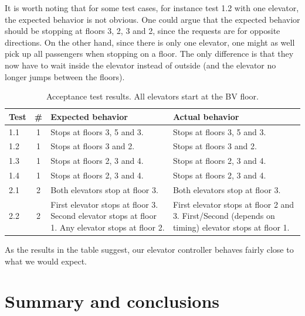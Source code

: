 \documentclass[a4paper]{article}
\begin{document}
It is worth noting that for some test cases, for instance test 1.2 with one
elevator, the expected behavior is not obvious. One could argue that the
expected behavior should be stopping at floors 3, 2, 3 and 2, since the requests
are for opposite directions. On the other hand, since there is only one
elevator, one might as well pick up all passengers when stopping on a floor. The
only difference is that they now have to wait inside the elevator instead of
outside (and the elevator no longer jumps between the floors).

\begin{table}[h]
    \begin{tabular}{| l | c | p{4.7cm} | p{4.7cm} |}
        \hline
        Test & \# & Expected behavior & Actual behavior \\
        \hline
        1.1 & 1 &
            Stops at floors 3, 5 and 3. &
            Stops at floors 3, 5 and 3. \\
        1.2 & 1 &
            Stops at floors 3 and 2. &
            Stops at floors 3 and 2. \\
        1.3 & 1 &
            Stops at floors 2, 3 and 4. &
            Stops at floors 2, 3 and 4. \\
        1.4 & 1 &
            Stops at floors 2, 3 and 4. &
            Stops at floors 2, 3 and 4. \\
        2.1 & 2 &
            Both elevators stop at floor 3. &
            Both elevators stop at floor 3. \\
        2.2 & 2 &
            First elevator stops at floor 3.
                Second elevator stops at floor 1.
                Any elevator stops at floor 2. &
            First elevator stops at floor 2 and 3.
            First/Second (depends on timing) elevator stops at floor 1. \\
        \hline
    \end{tabular}
    \caption{Acceptance test results. All elevators start at the BV floor.}
    \label{tab:acceptance_test_results}
\end{table}

As the results in the table suggest, our elevator controller behaves fairly
close to what we would expect.

\section{Summary and conclusions}
\end{document}
